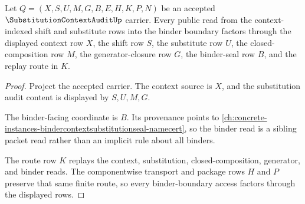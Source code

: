 \begin{theorem}
\label{thm:substitution-context-audit-binder-route}
Let $Q=(X,S,U,M,G,B,E,H,K,P,N)$ be an accepted $\SubstitutionContextAuditUp$ carrier. Every public read from the context-indexed shift and substitute rows into the binder boundary factors through the displayed context row $X$, the shift row $S$, the substitute row $U$, the closed-composition row $M$, the generator-closure row $G$, the binder-seal row $B$, and the replay route in $K$.
\end{theorem}
\begin{proof}
Project the accepted carrier. The context source is $X$, and the substitution audit content is displayed by $S,U,M,G$.

The binder-facing coordinate is $B$. Its provenance points to \autoref{ch:concrete-instances-bindercontextsubstitutionseal-namecert}, so the binder read is a sibling packet read rather than an implicit rule about all binders.

The route row $K$ replays the context, substitution, closed-composition, generator, and binder reads. The componentwise transport and package rows $H$ and $P$ preserve that same finite route, so every binder-boundary access factors through the displayed rows.
\end{proof}


